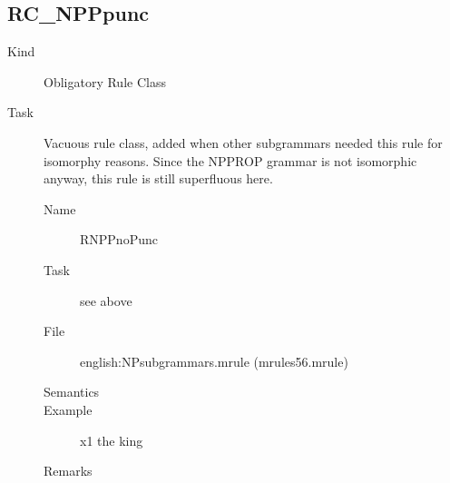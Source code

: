 \subsection{RC\_NPPpunc}
\begin{description}
\item[Kind] Obligatory Rule Class
\item[Task] Vacuous rule class, added when other subgrammars needed this rule 
for isomorphy reasons. Since the NPPROP grammar is not isomorphic anyway, this 
rule is still superfluous here.

\vspace{1 cm}
\begin{description}
\item[Name] RNPPnoPunc
\item[Task] see above
\item[File] english:NPsubgrammars.mrule (mrules56.mrule)
\item[Semantics]
\item[Example] x1 the king 
\item[Remarks]
\end{description}

\end{description}




